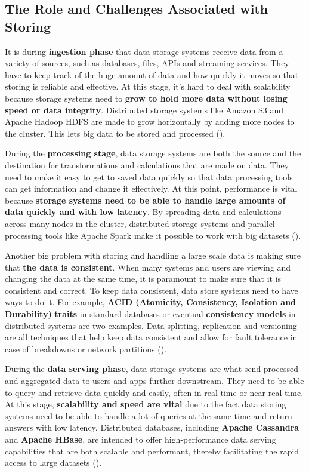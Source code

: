 \subsection{The Role and Challenges Associated with Storing}

It is during \textbf{ingestion phase} that data storage systems receive data from a variety of sources, such as databases, files, APIs and streaming services. They have to keep track of the huge amount of data and how quickly it moves so that storing is reliable and effective. At this stage, it's hard to deal with scalability because storage systems need to \textbf{grow to hold more data without losing speed or data integrity}. Distributed storage systems like Amazon S3 and Apache Hadoop HDFS are made to grow horizontally by adding more nodes to the cluster. This lets big data to be stored and processed (\cite{Nambiar2022AnOO})\footnotemark[20].

During the \textbf{processing stage}, data storage systems are both the source and the destination for transformations and calculations that are made on data. They need to make it easy to get to saved data quickly so that data processing tools can get information and change it effectively. At this point, performance is vital because \textbf{storage systems need to be able to handle large amounts of data quickly and with low latency}. By spreading data and calculations across many nodes in the cluster, distributed storage systems and parallel processing tools like Apache Spark make it possible to work with big datasets  (\cite{Nambiar2022AnOO})\footnotemark[20].

Another big problem with storing and handling a large scale data is making sure that \textbf{the data is consistent}. When many systems and users are viewing and changing the data at the same time, it is paramount to make sure that it is consistent and correct. To keep data consistent, data store systems need to have ways to do it. For example, \textbf{ACID (Atomicity, Consistency, Isolation and Durability)} \textbf{traits} in standard databases or eventual \textbf{consistency models} in distributed systems are two examples. Data splitting, replication and versioning are all techniques that help keep data consistent and allow for fault tolerance in case of breakdowns or network partitions (\cite{Nambiar2022AnOO})\footnotemark[20].

During the \textbf{data serving phase}, data storage systems are what send processed and aggregated data to users and apps further downstream. They need to be able to query and retrieve data quickly and easily, often in real time or near real time. At this stage, \textbf{scalability and speed are vital} due to the fact data storing systems need to be able to handle a lot of queries at the same time and return answers with low latency. Distributed databases, including \textbf{Apache Cassandra} and \textbf{Apache HBase}, are intended to offer high-performance data serving capabilities that are both scalable and performant, thereby facilitating the rapid access to large datasets (\cite{Nambiar2022AnOO})\footnotemark[20].

